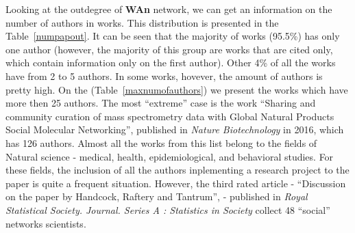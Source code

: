 \documentclass[11pt]{article} %
\begin{document}
Looking at the outdegree of \textbf{WAn} network, we can get an information on the number of authors in works. This distribution is presented in the Table~\ref{numpapout}. It can be seen that the majority of works (95.5\%) has only one author (however, the majority of this group are works that are cited only, which contain information only on the first author). Other 4\% of all the works have from 2 to 5 authors. In some works, hovever, the amount of authors is pretty high. On the (Table~\ref{maxnumofauthors}) we present the works which have more then 25 authors. The most ``extreme'' case is the work ``Sharing and community curation of mass spectrometry data with Global Natural Products Social Molecular Networking'', published in \textit{Nature Biotechnology} in 2016, which has 126 authors. Almost all the works from this list belong to the fields of Natural science - medical, health, epidemiological, and behavioral studies. For these fields, the inclusion of all the authors inplementing a research project to the paper is quite a frequent situation.  However, the third rated article - ``Discussion on the paper by Handcock, Raftery and Tantrum'', - published in \textit{Royal Statistical Society. Journal. Series A : Statistics in Society} collect 48 ``social'' networks scientists.\medskip
\end{document}
